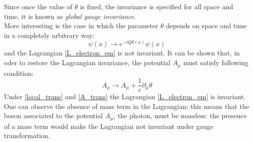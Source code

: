 Since once the value of $\theta$ is fixed, the invariance is specified for all space and time, it is known as \textit{global gauge invariance}. \\
More interesting is the case in which the parameter $\theta$ depends on space and time in a completely arbitrary way:
\begin{equation}
\psi(x)\to e^{-iQ\theta(x)} \psi(x)
\label{local_trans}
\end{equation}
and the Lagrangian \ref{L_electron_em} is not invariant.
It can be shown that, in oder to restore the Lagrangian invariance, the potential $A_{\mu}$ must satisfy following condition:
\begin{equation}
A_{\mu} \to A_{\mu} + \frac{1}{e}\partial_{\mu}\theta
\label{A_trans}
\end{equation}
Under \ref{local_trans} and \ref{A_trans} the Lagrangian \ref{L_electron_em} is invariant.\\ 
One can observe the absence of mass term in the Lagrangian: this means that the boson associated to the potential $A_{\mu}$, the photon, must be massless: the presence of a mass term would make the Lagrangian not invariant under gauge transformation. \\

